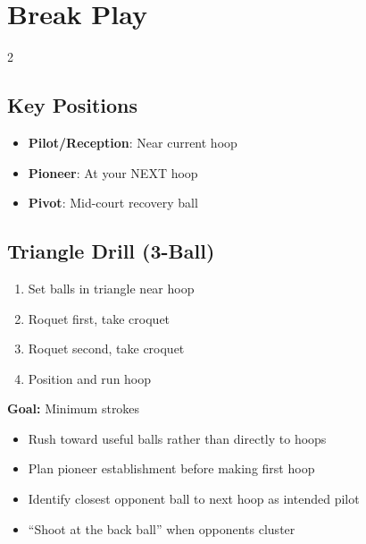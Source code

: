 \documentclass[11pt,a4paper]{article}
\begin{document}
\vspace{0.5em}

\section{Break Play}

\begin{multicols}{2}

\subsection*{Key Positions}
\begin{itemize}
    \item \textbf{Pilot/Reception}: Near current hoop
    \item \textbf{Pioneer}: At your NEXT hoop
    \item \textbf{Pivot}: Mid-court recovery ball
\end{itemize}

\subsection*{Triangle Drill (3-Ball)}
\begin{enumerate}
    \item Set balls in triangle near hoop
    \item Roquet first, take croquet
    \item Roquet second, take croquet
    \item Position and run hoop
\end{enumerate}
\textbf{Goal:} Minimum strokes

\end{multicols}

\begin{tcolorbox}[drillbox, colframe=aitoncolor!70, title={\color{aitoncolor}Aiton on Breaks}]
\begin{itemize}
    \item Rush toward useful balls rather than directly to hoops
    \item Plan pioneer establishment before making first hoop
    \item Identify closest opponent ball to next hoop as intended pilot
    \item ``Shoot at the back ball'' when opponents cluster
\end{itemize}
\end{tcolorbox}
\end{document}
